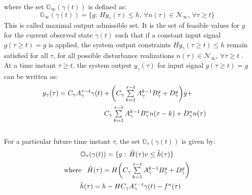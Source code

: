 \documentclass[letterpaper, 10 pt, conference]{ieeeconf}  %
\begin{document}
	where the set $\mathbb{O}_{\infty}(\gamma(t))$ is defined as:
	\begin{equation}
	\mathbb{O}_{\infty}(\gamma(t)) = \{g: \hspace{2pt} Hy_{\gamma}(\tau) \leq h ,\hspace{2pt} \forall n(\tau) \in \mathcal{N}_{\infty} ,\hspace{2pt} \forall \tau \geq t \} 
	\label{O_infty}
	\end{equation}
	This is called maximal output admissible set.
	It is the set of feasible values for $g$ for the current observed state $\gamma(t)$ such that if a constant input signal $g(\tau \geq t)=g$ is applied, the system output constraints $Hy_{\gamma}(\tau \geq t) \leq h$ remain satisfied for all $\tau$, for all possible disturbance realizations $n(\tau) \in \mathcal{N}_{\infty}$, $\forall \tau \geq t$ .
	At a time instant $\tau \geq t$, the system output $y_{\gamma}(\tau)$ for input signal $g(\tau \geq t)=g$ can be written as:
	\begin{equation*}
	\hspace{-30pt}
	\begin{aligned}
	\begin{matrix}
	y_{\gamma}(\tau) = C_{\gamma}A_{\gamma}^{\tau - t}\gamma(t) + \bigg( C_{\gamma}\sum\limits_{k=1}^{\tau - t}A_{\gamma}^{k-1}B^g_{\gamma} + D_{\gamma}^g \bigg)g + \vspace{5pt}\\  \hspace{110pt} C_{\gamma}\sum\limits_{k=1}^{\tau - t}A_{\gamma}^{k-1}B^n_{\gamma}n(\tau-k) + D_{\gamma}^n n(\tau)
	\end{matrix}
	\end{aligned}
	\end{equation*} \\
	For a particular future time instant $\tau$, the set $\mathbb{O}_{\tau}(\gamma(t))$ is given by:
	\begin{equation*}
	\begin{matrix}
	\mathbb{O}_{\tau}(\gamma(t)) = \{g: \hspace{2pt} \tilde{H}(\tau)v \leq \tilde{h}(\tau)\} \vspace{5pt}\\
	\text{where } \hspace{5pt} \tilde{H}(\tau) = H\bigg( C_{\gamma}\sum\limits_{k=1}^{\tau - t}A_{\gamma}^{k-1}B^g_{\gamma} + D_{\gamma}^g \bigg) \vspace{5pt} \\ \hspace{10pt}
	\tilde{h}(\tau) = h - HC_{\gamma}A_{\gamma}^{\tau - t}\gamma(t) - f^n(\tau) \vspace{5pt}
	\end{matrix} 
	\end{equation*}
\end{document}
